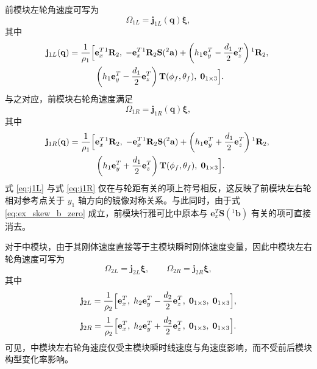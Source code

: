 前模块左轮角速度可写为
\begin{equation}
\Omega_{1L}
=
\mathbf j_{1L}(\mathbf q)\boldsymbol\xi,
\label{eq:j1L_mapping}
\end{equation}
其中
\begin{equation}
\mathbf j_{1L}(\mathbf q)
=
\frac{1}{\rho_1}
\begin{aligned}[t]
\Bigl[
&\mathbf e_x^T{}^{1}\mathbf R_2,\;
-\mathbf e_x^T{}^{1}\mathbf R_2\mathbf S({}^{2}\mathbf a)
+\left(h_1\mathbf e_y^T-\frac{d_1}{2}\mathbf e_z^T\right){}^{1}\mathbf R_2,\;\\
&\left(h_1\mathbf e_y^T-\frac{d_1}{2}\mathbf e_z^T\right)\mathbf T(\phi_f,\theta_f),\;
\mathbf 0_{1\times 3}
\Bigr].
\end{aligned}
\label{eq:j1L}
\end{equation}
与之对应，前模块右轮角速度满足
\begin{equation}
\Omega_{1R}
=
\mathbf j_{1R}(\mathbf q)\boldsymbol\xi,
\label{eq:j1R_mapping}
\end{equation}
其中
\begin{equation}
\mathbf j_{1R}(\mathbf q)
=
\frac{1}{\rho_1}
\begin{aligned}[t]
\Bigl[
&\mathbf e_x^T{}^{1}\mathbf R_2,\;
-\mathbf e_x^T{}^{1}\mathbf R_2\mathbf S({}^{2}\mathbf a)
+\left(h_1\mathbf e_y^T+\frac{d_1}{2}\mathbf e_z^T\right){}^{1}\mathbf R_2,\;\\
&\left(h_1\mathbf e_y^T+\frac{d_1}{2}\mathbf e_z^T\right)\mathbf T(\phi_f,\theta_f),\;
\mathbf 0_{1\times 3}
\Bigr].
\end{aligned}
\label{eq:j1R}
\end{equation}
式 \eqref{eq:j1L} 与式 \eqref{eq:j1R} 仅在与轮距有关的项上符号相反，这反映了前模块左右轮相对参考点关于 $y_1$ 轴方向的镜像对称关系。与此同时，由于式 \eqref{eq:ex_skew_b_zero} 成立，前模块行雅可比中原本与 $\mathbf e_x^T\mathbf S({}^{1}\mathbf b)$ 有关的项可直接消去。

对于中模块，由于其刚体速度直接等于主模块瞬时刚体速度变量，因此中模块左右轮角速度可写为
\begin{equation}
\Omega_{2L}
=
\mathbf j_{2L}\boldsymbol\xi,
\qquad
\Omega_{2R}
=
\mathbf j_{2R}\boldsymbol\xi,
\label{eq:j2_mapping}
\end{equation}
其中
\begin{equation}
\mathbf j_{2L}
=
\frac{1}{\rho_2}
\Bigl[
\mathbf e_x^T,\;
h_2\mathbf e_y^T-\frac{d_2}{2}\mathbf e_z^T,\;
\mathbf 0_{1\times 3},\;
\mathbf 0_{1\times 3}
\Bigr],
\label{eq:j2L}
\end{equation}
\begin{equation}
\mathbf j_{2R}
=
\frac{1}{\rho_2}
\Bigl[
\mathbf e_x^T,\;
h_2\mathbf e_y^T+\frac{d_2}{2}\mathbf e_z^T,\;
\mathbf 0_{1\times 3},\;
\mathbf 0_{1\times 3}
\Bigr].
\label{eq:j2R}
\end{equation}
可见，中模块左右轮角速度仅受主模块瞬时线速度与角速度影响，而不受前后模块构型变化率影响。

